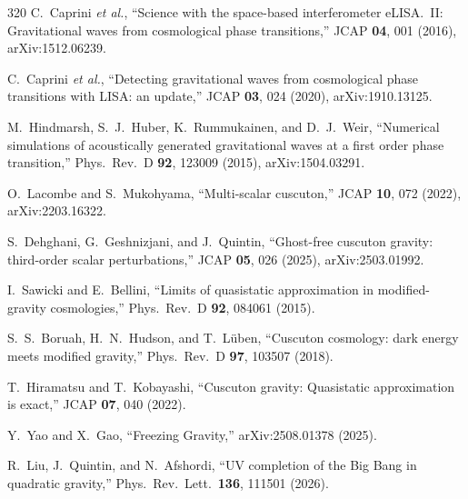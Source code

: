 \begin{thebibliography}{320}
C.~Caprini \emph{et al.},
``Science with the space-based interferometer eLISA.\ II: Gravitational waves from cosmological phase transitions,''
JCAP \textbf{04}, 001 (2016),
arXiv:1512.06239.

C.~Caprini \emph{et al.},
``Detecting gravitational waves from cosmological phase transitions with LISA: an update,''
JCAP \textbf{03}, 024 (2020),
arXiv:1910.13125.

M.~Hindmarsh, S.~J.~Huber, K.~Rummukainen, and D.~J.~Weir,
``Numerical simulations of acoustically generated gravitational waves at a first order phase transition,''
Phys.\ Rev.\ D \textbf{92}, 123009 (2015),
arXiv:1504.03291.

O.~Lacombe and S.~Mukohyama,
``Multi-scalar cuscuton,''
JCAP \textbf{10}, 072 (2022),
arXiv:2203.16322.

S.~Dehghani, G.~Geshnizjani, and J.~Quintin,
``Ghost-free cuscuton gravity: third-order scalar perturbations,''
JCAP \textbf{05}, 026 (2025),
arXiv:2503.01992.

I.~Sawicki and E.~Bellini,
``Limits of quasistatic approximation in modified-gravity cosmologies,''
Phys.\ Rev.\ D \textbf{92}, 084061 (2015).

S.~S.~Boruah, H.~N.~Hudson, and T.~L\"uben,
``Cuscuton cosmology: dark energy meets modified gravity,''
Phys.\ Rev.\ D \textbf{97}, 103507 (2018).

T.~Hiramatsu and T.~Kobayashi,
``Cuscuton gravity: Quasistatic approximation is exact,''
JCAP \textbf{07}, 040 (2022).

Y.~Yao and X.~Gao,
``Freezing Gravity,''
arXiv:2508.01378 (2025).

R.~Liu, J.~Quintin, and N.~Afshordi,
``UV completion of the Big Bang in quadratic gravity,''
Phys.\ Rev.\ Lett.\ \textbf{136}, 111501 (2026).

\end{thebibliography}
